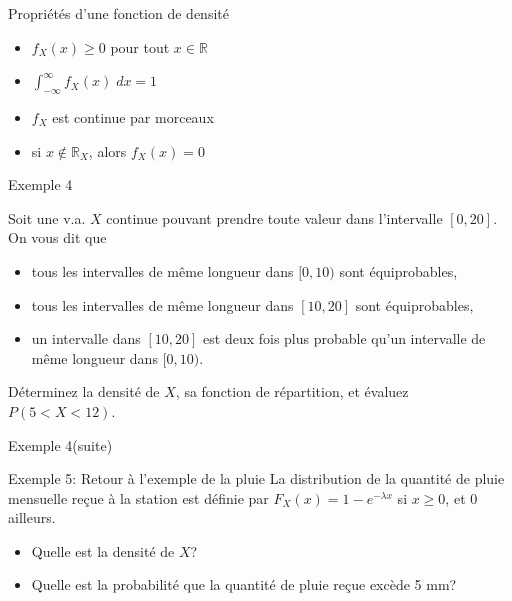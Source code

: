 \documentclass[handout]{BeamerTemplate}
\begin{document}
\begin{frame}[t]{Propriétés d'une fonction de densité}

\begin{itemize}
 \item[1.] $f_X(x)\ge0$ pour tout $x\in\mathbb{R}$
 \item[2.] $\displaystyle\int_{-\infty}^\infty f_X(x)\;dx=1$
 \item[3.] $f_X$ est continue par morceaux
 \item[4.] si $x\notin \mathbb{R}_X$, alors $f_X(x)=0$ %
\end{itemize}


\end{frame}


\begin{frame}[t]{Exemple 4}

{\small
Soit une v.a. $X$ continue pouvant prendre toute valeur dans l'intervalle
$[0,20]$. On vous dit que
\begin{itemize}
\item tous les intervalles de même longueur dans $[0,10)$ sont équiprobables,
\item tous les intervalles de même longueur dans $[10,20]$ sont équiprobables,
\item un intervalle dans $[10,20]$ est deux fois plus probable qu'un intervalle de même longueur dans $[0,10)$.
    \end{itemize}
Déterminez la densité de $X$, sa fonction de répartition, et évaluez $P(5<X<12)$.}
\end{frame}

\begin{frame}[t]{Exemple 4(suite)}
\end{frame}

\begin{frame}[t]{Exemple 5: Retour à l'exemple de la pluie}
La distribution de la quantité de pluie mensuelle re\c{c}ue à la station
est définie par $F_X(x)=1-e^{-\lambda x}$ si
$x\ge0$, et $0$ ailleurs.
\begin{itemize}\itemsep 2cm
\item Quelle est la densité de $X$?
\item Quelle est la probabilité que la quantité de pluie re\c{c}ue excède 5 mm?
\end{itemize}
\end{frame}
\end{document}
